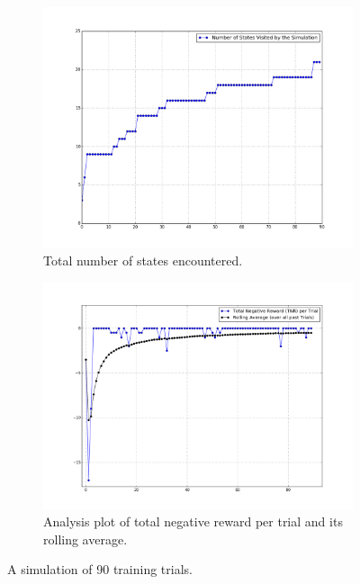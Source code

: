 \documentclass[paper=a4, fontsize=11pt]{scrartcl}
\numberwithin{equation}{section}		%
\numberwithin{figure}{section}			%
\numberwithin{table}{section}				%
\begin{document}
	 
\begin{figure}
 	\centering
 	\begin{subfigure}{.5\textwidth}
 		\centering
 		\includegraphics[width= \linewidth]{5_STATES}
 		\caption{Total number of states encountered.}
 		\label{fig:sub1}
 	\end{subfigure}%
 	\begin{subfigure}{.5\textwidth}
 		\centering
 		\includegraphics[width= \linewidth]{5_TNR}
 		\caption{Analysis plot of total negative reward per trial and its rolling average.}
 		\label{fig:sub2}
 	\end{subfigure}
 	\caption{A simulation of 90 training trials. }
 	\label{fig:test}
\end{figure}
\end{document}
